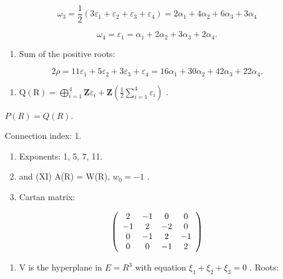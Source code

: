 \[
\omega_ {3} = \frac {1}{2} (3 \varepsilon_ {1} + \varepsilon_ {2} + \varepsilon_ {3} + \varepsilon_ {4}) = 2 \alpha_ {1} + 4 \alpha_ {2} + 6 \alpha_ {3} + 3 \alpha_ {4}
\]

\[
\omega_ {4} = \varepsilon_ {1} = \alpha_ {1} + 2 \alpha_ {2} + 3 \alpha_ {3} + 2 \alpha_ {4}.
\]

\begin{enumerate}
\def\labelenumi{(\Roman{enumi})}
\setcounter{enumi}{6}
\tightlist
\item
  Sum of the positive roots:
\end{enumerate}

\[
2 \rho = 11 \varepsilon_ {1} + 5 \varepsilon_ {2} + 3 \varepsilon_ {3} + \varepsilon_ {4} = 16 \alpha_ {1} + 30 \alpha_ {2} + 42 \alpha_ {3} + 22 \alpha_ {4}.
\]

\begin{enumerate}
\def\labelenumi{(\Roman{enumi})}
\setcounter{enumi}{7}
\tightlist
\item
  \(\mathrm{Q}(\mathrm{R}) = \bigoplus_{i=1}^{4} \mathbf{Z} \varepsilon_i + \mathbf{Z}\left(\frac{1}{2} \sum_{i=1}^{4} \varepsilon_i\right)\) .
\end{enumerate}

\(P(R) = Q(R).\)

Connection index: 1.

\begin{enumerate}
\def\labelenumi{(\Roman{enumi})}
\setcounter{enumi}{8}
\item
  Exponents: 1, 5, 7, 11.
\item
  and (XI) A(R) = W(R), \(w_{0} = -1\) .
\item
  Cartan matrix:
\end{enumerate}

\[
\left( \begin{array}{c c c c} 2 & - 1 & 0 & 0 \\ - 1 & 2 & - 2 & 0 \\ 0 & - 1 & 2 & - 1 \\ 0 & 0 & - 1 & 2 \end{array} \right)
\]


\begin{enumerate}
\def\labelenumi{(\Roman{enumi})}
\tightlist
\item
  V is the hyperplane in \(E = R^{3}\) with equation \(\xi_{1} + \xi_{2} + \xi_{3} = 0\) . Roots:
\end{enumerate}

